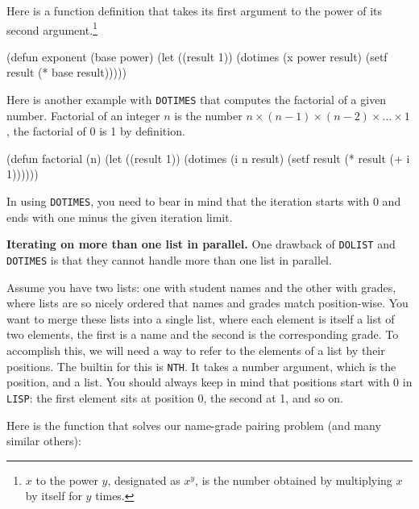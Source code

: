 \documentclass[a4paper,11pt]{article}
\begin{document}
\begin{uenum}
\begin{uenumi}
\item
Here is a function definition that takes its first argument to the power of its second argument.\footnote{$x$ to the power $y$, designated as $x^y$, is the number obtained by multiplying $x$ by itself for $y$ times.}

\begin{lispcode}
(defun exponent (base power)
  (let ((result 1))
	(dotimes (x power result)
	  (setf result (* base result)))))
\end{lispcode}

\item Here is another example with \Verb+DOTIMES+ that computes the factorial of a given number. Factorial of an integer $n$ is the number $n\times(n-1)\times(n-2)\times\ldots\times 1$, the factorial of 0 is 1 by definition. 

\begin{lispcode}
(defun factorial (n)
  (let ((result 1))
	(dotimes (i n result)
	  (setf result (* result (+ i 1))))))
\end{lispcode}

In using \Verb+DOTIMES+, you need to bear in mind that the iteration starts with 0 and ends with one minus the given iteration limit.
\end{uenumi}

\item {\bf Iterating on more than one list in parallel.} One drawback of \Verb+DOLIST+ and \Verb+DOTIMES+ is that they cannot handle more than one list in parallel.

\begin{uenumi}
\item Assume you have two lists: one with student names and the other with grades, where lists are so nicely ordered that names and grades match position-wise. You want to merge these lists into a single list, where each element is itself a list of two elements, the first is a name and the second is the corresponding grade. To accomplish this, we will need a way to refer to the elements of a list by their positions. The builtin for this is \Verb+NTH+. It takes a number argument, which is the  position, and a list. You should always keep in mind that positions start with 0 in \Verb+LISP+: the first element sits at position 0, the second at 1, and so on.

\item Here is the function that solves our name-grade pairing problem (and many similar others):


\end{uenumi}
\end{uenum}
\end{document}

